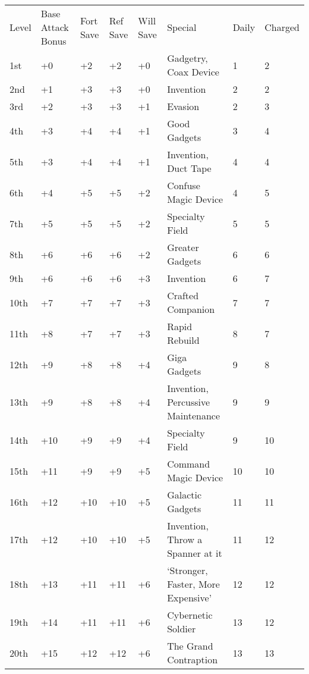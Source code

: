 \vspace{-8pt}







\begin{table}[htb]
\begin{small}
\begin{tabular}[h]{lp{1.9cm}p{0.7cm}p{0.7cm}p{0.7cm}p{7cm}ll}
Level&Base Attack Bonus&Fort Save&Ref Save&Will Save&Special&Daily&Charged\\
1st&  +0  & +2&  +2&  +0&Gadgetry, Coax Device  & 1& 2 \\
2nd&  +1  & +3&  +3&  +0&Invention  & 2& 2 \\
3rd&  +2  & +3&  +3&  +1&Evasion  & 2& 3 \\
4th&  +3  & +4&  +4&  +1&Good Gadgets  & 3& 4 \\
5th&  +3  & +4&  +4&  +1&Invention, Duct Tape  & 4& 4 \\
6th&  +4  & +5&  +5&  +2&Confuse Magic Device  & 4& 5 \\
7th&  +5  & +5&  +5&  +2&Specialty Field  & 5& 5 \\
8th&  +6  & +6&  +6&  +2&Greater Gadgets  & 6& 6 \\
9th&  +6  & +6&  +6&  +3&Invention  & 6& 7 \\
10th& +7  & +7&  +7&  +3&Crafted Companion  & 7& 7 \\
11th& +8  & +7&  +7&  +3&Rapid Rebuild  & 8& 7 \\
12th& +9  & +8&  +8&  +4&Giga Gadgets  & 9& 8 \\
13th& +9  & +8&  +8&  +4&Invention, Percussive Maintenance  & 9& 9 \\
14th& +10 & +9&  +9&  +4&Specialty Field  & 9& 10\\
15th& +11 & +9&  +9&  +5&Command Magic Device  & 10&10\\
16th& +12 & +10& +10& +5&Galactic Gadgets  & 11&11\\
17th& +12 & +10& +10& +5&Invention, Throw a Spanner at it  & 11&12\\
18th& +13 & +11& +11& +6&`Stronger, Faster, More Expensive'  & 12&12\\
19th& +14 & +11& +11& +6&Cybernetic Soldier  & 13&12\\
20th& +15 & +12& +12& +6&The Grand Contraption  & 13&13\\
\end{tabular}
\end{small}
\end{table}

